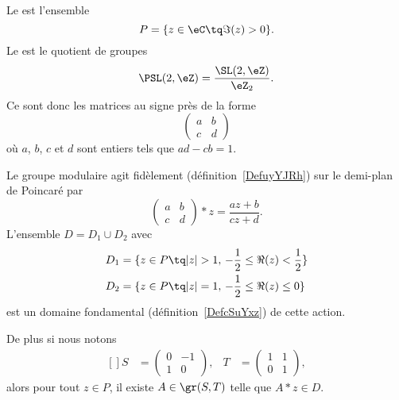 Le  est l'ensemble
\begin{equation}
	P=\{ z\in \eC\tq \Im(z)>0 \}.
\end{equation}
Le  est le quotient de groupes
\begin{equation}
	\PSL(2,\eZ)=\frac{ \SL(2,\eZ) }{ \eZ_2 }.
\end{equation}
Ce sont donc les matrices au signe près de la forme
\begin{equation}
	\begin{pmatrix}
		a & b \\
		c & d
	\end{pmatrix}
\end{equation}
où \( a\), \( b\), \( c\) et \( d\) sont entiers tels que \( ad-cb=1\).

\begin{theorem} \label{ThoItqXCm}
	Le groupe modulaire agit fidèlement (définition~\ref{DefuyYJRh}) sur le demi-plan de Poincaré par
	\begin{equation}    \label{EqVXvwlB}
		\begin{pmatrix}
			a & b \\
			c & d
		\end{pmatrix}*z=\frac{ az+b }{ cz+d }.
	\end{equation}
	L'ensemble \(D= D_1\cup D_2\) avec
	\begin{subequations}
		\begin{align}
			D_1 & =\{ z\in P\tq | z |>1,\,-\frac{ 1 }{2}\leq \Re(z)<\frac{ 1 }{2} \} \\
			D_2 & =\{ z\in P\tq | z |=1,\,-\frac{ 1 }{2}\leq \Re(z)\leq0 \}
		\end{align}
	\end{subequations}
	est un domaine fondamental (définition~\ref{DefcSuYxz}) de cette action.

	De plus si nous notons
	\begin{equation}
		\begin{aligned}[]
			S & =\begin{pmatrix}
				     0 & -1 \\
				     1 & 0
			     \end{pmatrix}, & T & =\begin{pmatrix}
				                           1 & 1 \\
				                           0 & 1
			                           \end{pmatrix},
		\end{aligned}
	\end{equation}
	alors pour tout \( z\in P\), il existe \( A\in \gr(S,T)\) telle que \( A*z\in D\).
\end{theorem}

